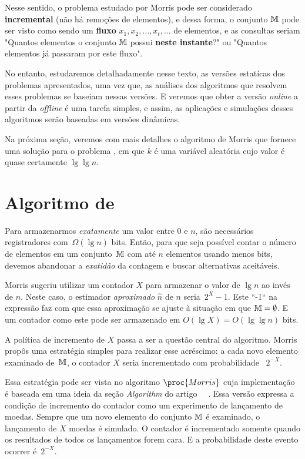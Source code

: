 Nesse sentido, o problema estudado por Morris pode ser considerado \textbf{incremental} (não há remoções de elementos), 
e dessa forma, o conjunto $\mathbb{M}$ pode ser visto como sendo um \textbf{fluxo} $x_1, x_2, \dots, x_t, \dots$ de elementos, 
e as consultas seriam "Quantos elementos o conjunto $\mathbb{M}$ possui \textbf{neste instante}$?$" ou 
"Quantos elementos já passaram por este fluxo".

No entanto, estudaremos detalhadamente nesse texto, as versões estatícas dos problemas apresentados, uma vez que, as 
análises dos algoritmos que resolvem esses problemas se baseiam nessas versões. E veremos que obter a versão 
\textit{online} a partir da \textit{offline} é uma tarefa simples, e assim, as aplicações e simulações desses algoritmos 
serão baseadas em versões dinâmicas.

Na próxima seção, veremos com mais detalhes o algoritmo de Morris que fornece uma solução para o problema 
, em que $k$ é uma variável aleatória cujo valor é quase certamente $\lg \lg n$.

\section{Algoritmo de }

Para armazenarmos \textit{exatamente} um valor entre $0$ e $n$, são necessários registradores com~$\Omega(\lg n)$ bits. 
Então, para que seja possível contar o número de elementos em um conjunto~$\mathbb{M}$ com até $n$ elementos usando menos 
bits, devemos abandonar a \textit{exatidão} da contagem e buscar alternativas aceitáveis.

Morris sugeriu utilizar um contador $X$ para armazenar o valor de $\lg n$ ao invés de $n$. Neste caso, o estimador 
\textit{aproximado} $\hat{n}$ de $n$ seria~$2^{X} - 1$. Este ``-1`` na expressão faz com que essa aproximação se ajuste 
à situação em que $\mathbb{M} = \emptyset$. E um contador como este pode ser armazenado em $O(\lg X) = O(\lg \lg n)$ bits.

A política de incremento de $X$ passa a ser a questão central do algoritmo. Morris propôs uma estratégia simples para 
realizar esse acréscimo: a cada novo elemento examinado de~$\mathbb{M}$, o contador $X$ seria incrementado com probabilidade~ 
$2^{-X}$.

Essa estratégia pode ser vista no algoritmo $\proc{Morris}$ cuja implementação é baseada em uma ideia da seção 
\textit{Algorithm} do artigo ~~\citep{ApproximateCountingAlgorithm}. Essa 
versão expressa a condição de incremento do contador como um experimento de lançamento de moedas. Sempre que um novo 
elemento do conjunto $\mathbb{M}$ é examinado, o lançamento de $X$ moedas é simulado. O contador é incrementado somente quando 
os resultados de todos os lançamentos forem cara. E a probabilidade deste evento ocorrer é~$2^{-X}$.

